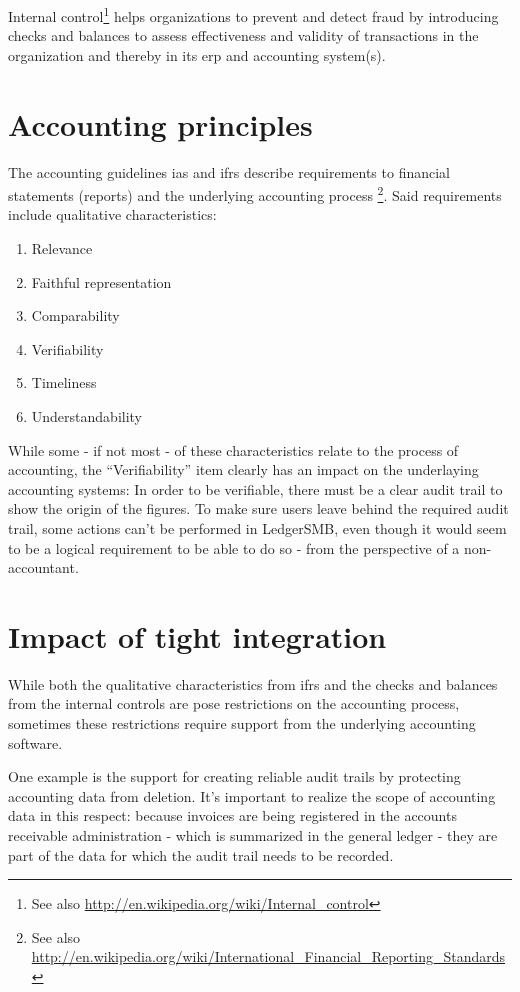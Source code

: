 Internal control\footnote{See also \url{http://en.wikipedia.org/wiki/Internal_control}}
helps organizations to prevent and detect fraud by introducing checks and balances
to assess effectiveness and validity of transactions in the organization and thereby
in its \gls{erp} and accounting system(s).

\section{Accounting principles}
\label{sec-system-accounting-principles}

The accounting guidelines \gls{ias} and \gls{ifrs} describe requirements
to financial statements (reports) and the underlying accounting process
\footnote{See also \url{http://en.wikipedia.org/wiki/International_Financial_Reporting_Standards}}.
Said requirements include qualitative characteristics:

\begin{enumerate}
\item Relevance
\item Faithful representation
\item Comparability
\item Verifiability
\item Timeliness
\item Understandability
\end{enumerate}

While some - if not most - of these characteristics relate to the process of accounting,
the ``Verifiability'' item clearly has an impact on the underlaying accounting systems:
In order to be verifiable, there must be a clear audit trail to show the origin of the
figures. To make sure users leave behind the required audit trail, some actions can't
be performed in LedgerSMB, even though it would seem to be a logical requirement to be
able to do so - from the perspective of a non-accountant.


\section{Impact of tight integration}
\label{sec-system-impact-of-tight-integration}

While both the qualitative characteristics from \gls{ifrs} and the checks and balances
from the internal controls are pose restrictions on the accounting process,
sometimes these restrictions require support from the underlying accounting
software.

One example is the support for creating reliable audit trails
by protecting accounting data from deletion. It's important to realize the scope
of accounting data in this respect: because invoices are being registered in the
accounts receivable administration - which is summarized in the general ledger -
they are part of the data for which the audit trail needs to be recorded.

